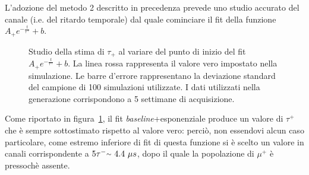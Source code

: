 \documentclass[10pt, oneside, a4paper]{article}   	%
\begin{document}
L'adozione del metodo 2 descritto in precedenza prevede uno studio accurato del canale (i.e. del ritardo temporale) dal quale cominciare il fit della funzione $A_+e^{-\frac{t}{\tau^+}}+b$. 
\begin{figure}[h]
  \centerline{}
  \caption{Studio della stima di $\tau_+$ al variare del punto di inizio del fit $A_+e^{-\frac{t}{\tau^+}}+b$. La linea rossa rappresenta il valore vero impostato nella simulazione. Le barre d'errore rappresentano la deviazione standard del campione di 100 simulazioni utilizzate. I dati utilizzati nella generazione corrispondono a 5 settimane di acquisizione.}
  \label{fig::tauplusstart}
\end{figure}
Come riportato in figura~\ref{fig::tauplusstart}, il fit \textit{baseline}+esponenziale produce un valore di $\tau^+$ che è sempre sottostimato rispetto al valore vero: perciò, non essendovi alcun caso particolare, come estremo inferiore di fit di questa funzione si è scelto un valore in canali corrispondente a $5\tau^-  {\raise.17ex\hbox{$\scriptstyle\sim$}} \  4.4  \ \mu s$, dopo il quale la popolazione di $\mu^+$ è pressochè assente.
\end{document}
